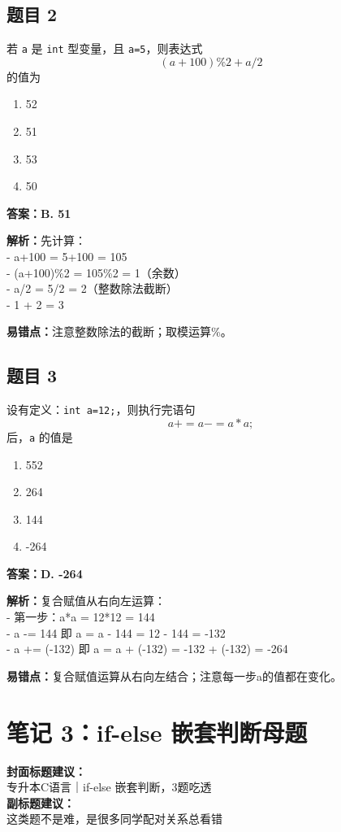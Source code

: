 \documentclass[12pt,a4paper]{ctexart}
\begin{document}
\subsection*{题目 2}
若 \texttt{a} 是 \texttt{int} 型变量，且 \texttt{a=5}，则表达式
\[
	(a+100)\%2 + a/2
\]
的值为
\begin{enumerate}[label=\Alph*.]
	\item 52
	\item 51
	\item 53
	\item 50
\end{enumerate}

\begin{answerbox}
	\textbf{答案：B. 51}

	\textbf{解析：}先计算：\\
	- a+100 = 5+100 = 105\\
	- (a+100)\%2 = 105\%2 = 1（余数）\\
	- a/2 = 5/2 = 2（整数除法截断）\\
	- 1 + 2 = 3

	\textbf{易错点：}注意整数除法的截断；取模运算\%。
\end{answerbox}

\subsection*{题目 3}
设有定义：\texttt{int a=12;}，则执行完语句
\[
	a += a -= a*a;
\]
后，\texttt{a} 的值是
\begin{enumerate}[label=\Alph*.]
	\item 552
	\item 264
	\item 144
	\item -264
\end{enumerate}

\begin{answerbox}
	\textbf{答案：D. -264}

	\textbf{解析：}复合赋值从右向左运算：\\
	- 第一步：a*a = 12*12 = 144\\
	- a -= 144 即 a = a - 144 = 12 - 144 = -132\\
	- a += (-132) 即 a = a + (-132) = -132 + (-132) = -264

	\textbf{易错点：}复合赋值运算从右向左结合；注意每一步a的值都在变化。
\end{answerbox}

\newpage

\section{笔记 3：if-else 嵌套判断母题}
\begin{coverbox}
	\textbf{封面标题建议：}\\
	专升本C语言｜if-else 嵌套判断，3题吃透\\
	\textbf{副标题建议：}\\
	这类题不是难，是很多同学配对关系总看错
\end{coverbox}
\end{document}

